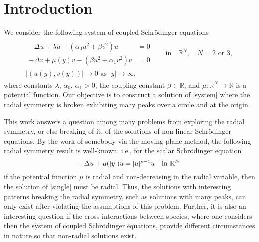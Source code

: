 \documentclass[a4paper,11pt]{article}
\def\red{\color{red}}
\def\red{\color{red}}
\theoremstyle{remark}
\begin{document}
\section{Introduction} \label{sec:intro}

We consider the following system of coupled Schr\"odinger equations 
\begin{align}\label{system}
 \begin{aligned}
 \begin{aligned}
 -\Delta u + \lambda u - \left(\alpha_0 u^2 + \beta v^2\right) u&= 0 \\
 -\Delta v + \mu(y) v - \left(\beta u^2 + \alpha_1 v^2\right) v&= 0
 \end{aligned} \quad &\text{in} \quad \mathbb{R}^N, \quad \text{$N=2$ or $3$},\\
 \text{$\big|(u(y),v(y))\big| \rightarrow 0$ as $|y| \rightarrow \infty$},&
 \end{aligned}
\end{align}
where constants $\lambda$, $\alpha_0$, $\alpha_1>0$, the coupling constant $\beta \in \mathbb{R}$, and $\mu: \mathbb{R}^N \rightarrow \mathbb{R}$ is a potential function.
Our objective is to construct a solution of \eqref{system} where the radial symmetry is broken exhibiting many peaks over a circle and at the origin.

This work answers a question among many problems from exploring the radial symmetry, or else breaking of it, of the solutions of non-linear Schr\"odinger equations. By the work of {\red somebody} via the moving plane method, the following radial symmetry result is well-known, i.e., for the scalar Schr\"odinger equation
\begin{equation} \label{single}
 -\Delta u + \mu(|y|) u = |u|^{p-1}u \quad \text{in $ \mathbb{R}^N$} %
\end{equation}
if the potential function $\mu$ is radial and non-decreasing in the radial variable, then the solution of \eqref{single} must be radial. Thus, the solutions with interesting patterns breaking the radial symmetry, such as solutions with many peaks, can only exist after violating the assumptions of this problem. Further, it is also an interesting question if the cross interactions between species, where one considers then the system of coupled Schr\"odinger equations, provide different circumstances in nature so that non-radial solutions exist.
\end{document}
